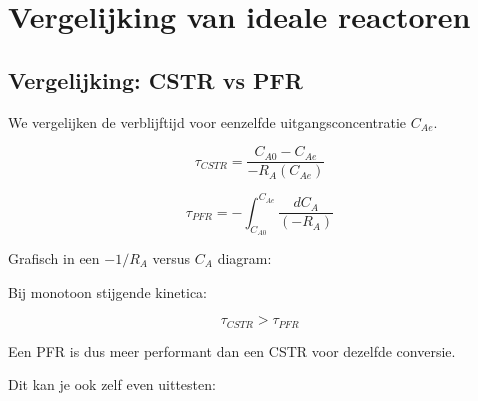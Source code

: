 \documentclass{ximera}
\begin{document}
\section{Vergelijking van ideale reactoren}
\subsection{Vergelijking: CSTR vs PFR}

We vergelijken de verblijftijd voor eenzelfde uitgangsconcentratie $C_{Ae}$.

\[
\tau_{CSTR} = \frac{C_{A0}-C_{Ae}}{-R_A(C_{Ae})}
\]

\[
\tau_{PFR} = - \int_{C_{A0}}^{C_{Ae}} \frac{dC_A}{(-R_A)}
\]


Grafisch in een $-1/R_A$ versus $C_A$ diagram:

\begin{center}
\end{center}

\begin{conclusion}
Bij monotoon stijgende kinetica:


\[
\tau_{CSTR} > \tau_{PFR}
\]

Een PFR is dus meer performant dan een CSTR voor dezelfde conversie.
\end{conclusion}

Dit kan je ook zelf even uittesten:
\begin{center}
\end{center}
\end{document}
